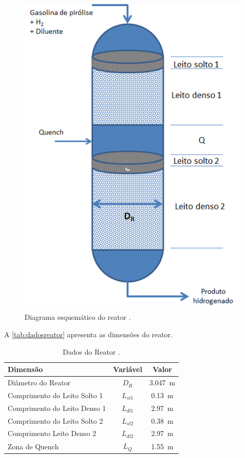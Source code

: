 \begin{figure}[htb]
\centering \includegraphics[scale=0.75]{images/Chap3/esquemareator.png}
\caption{Diagrama esquemático do reator \cite{Rojas2014a}.}
\label{fig:esquemareator}
\end{figure}

A \autoref{tab:dadosreator} apresenta as dimensões do reator.

\begin{table}[!htb]
\begin{center}
\caption{Dados do Reator \cite{Rojas2014a}.}
\label{tab:dadosreator}
\small
\begin{tabular}{lcc}
{Dimensão} & {Variável} & {Valor}
\\
\hline
{Diâmetro do Reator} & {$D_R$} & \SI{3,047}{m} \\
{Comprimento do Leito Solto 1} & {$L_{sl1}$} & \SI{0,13}{m} \\
{Comprimento do Leito Denso 1} & {$L_{dl1}$} & \SI{2,97}{m} \\
{Comprimento do Leito Solto 2} & {$L_{sl2}$} & \SI{0,38}{m} \\
{Comprimento Leito Denso 2} & {$L_{dl2}$} & \SI{2,97}{m} \\
{Zona de Quench} & {$L_{Q}$} & \SI{1,55}{m} \\
\bottomrule
\end{tabular}
\end{center}
\end{table}

